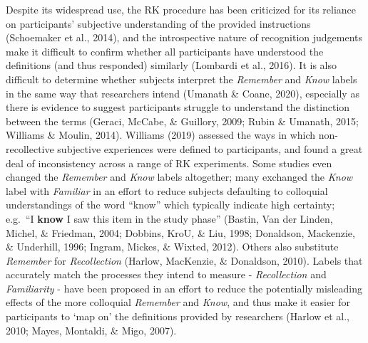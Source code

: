 \documentclass[
  11pt,
]{article}
\begin{document}
Despite its widespread use, the RK procedure has been criticized for its
reliance on participants' subjective understanding of the provided
instructions (Schoemaker et al., 2014), and the introspective nature of
recognition judgements make it difficult to confirm whether all
participants have understood the definitions (and thus responded)
similarly (Lombardi et al., 2016). It is also difficult to determine
whether subjects interpret the \emph{Remember} and \emph{Know} labels in
the same way that researchers intend (Umanath \& Coane, 2020),
especially as there is evidence to suggest participants struggle to
understand the distinction between the terms (Geraci, McCabe, \&
Guillory, 2009; Rubin \& Umanath, 2015; Williams \& Moulin, 2014).
Williams (2019) assessed the ways in which non-recollective subjective
experiences were defined to participants, and found a great deal of
inconsistency across a range of RK experiments. Some studies even
changed the \emph{Remember} and \emph{Know} labels altogether; many
exchanged the \emph{Know} label with \emph{Familiar} in an effort to
reduce subjects defaulting to colloquial understandings of the word
``know'' which typically indicate high certainty; e.g.~``I \textbf{know}
I saw this item in the study phase'' (Bastin, Van der Linden, Michel, \&
Friedman, 2004; Dobbins, KroU, \& Liu, 1998; Donaldson, Mackenzie, \&
Underhill, 1996; Ingram, Mickes, \& Wixted, 2012). Others also
substitute \emph{Remember} for \emph{Recollection} (Harlow, MacKenzie,
\& Donaldson, 2010). Labels that accurately match the processes they
intend to measure - \emph{Recollection} and \emph{Familiarity} - have
been proposed in an effort to reduce the potentially misleading effects
of the more colloquial \emph{Remember} and \emph{Know}, and thus make it
easier for participants to `map on' the definitions provided by
researchers (Harlow et al., 2010; Mayes, Montaldi, \& Migo, 2007).

~
\end{document}
